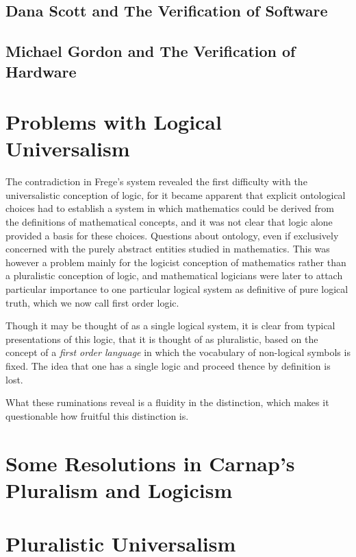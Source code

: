   \subsection{Dana Scott and The Verification of Software}

  \subsection{Michael Gordon and The Verification of Hardware}

  
  
  \section{Problems with Logical Universalism}

  The contradiction in Frege's system revealed the first difficulty with the universalistic conception of logic, for it became apparent that explicit ontological choices had to establish a system in which mathematics could be derived from the definitions of mathematical concepts, and it was not clear that logic alone provided a basis for these choices.
  Questions about ontology, even if exclusively concerned with the purely abstract entities studied in mathematics.
  This was however a problem mainly for the logicist conception of mathematics rather than a pluralistic conception of logic, and mathematical logicians were later to attach particular importance to one particular logical system as definitive of pure logical truth, which we now call first order logic.

  Though it may be thought of as a single logical system, it is clear from typical presentations of this logic, that it is thought of as pluralistic, based on the concept of a \emph{first order language} in which the vocabulary of non-logical symbols is fixed.
  The idea that one has a single logic and proceed thence by definition is lost.

  What these ruminations reveal is a fluidity in the distinction, which makes it questionable how fruitful this distinction is.

  \section{Some Resolutions in Carnap's Pluralism and Logicism}

  

  \section{Pluralistic Universalism}
  
